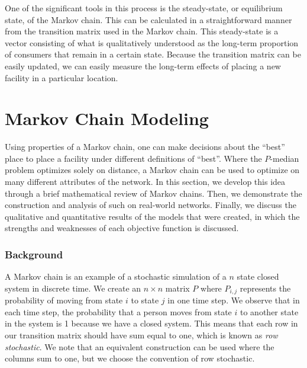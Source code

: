 \documentclass[twoside,twocolumn]{article}
\begin{document}
One of the significant tools in this process is the steady-state, or equilibrium state, of the Markov chain.
This can be calculated in a straightforward manner from the transition matrix used in the Markov chain.
This steady-state is a vector consisting of what is qualitatively understood as the long-term proportion of consumers that remain in a certain state. %
Because the transition matrix can be easily updated, we can easily measure the long-term effects of placing a new facility in a particular location.

\section{Markov Chain Modeling}

Using properties of a Markov chain, one can make decisions about the ``best'' place to place a facility under different definitions of ``best''.
Where the $P$-median problem optimizes solely on distance, a Markov chain can be used to optimize on many different attributes of the network.
In this section, we develop this idea through a brief mathematical review of Markov chains.
Then, we demonstrate the construction and analysis of such on real-world networks. %
Finally, we discuss the qualitative and quantitative results of the models that were created, in which the strengths and weaknesses of each objective function is discussed. %

\subsubsection{Background}

A Markov chain is an example of a stochastic simulation of a $n$ state closed system in discrete time.
We create an $n\times n$ matrix $P$ where $P_{i,j}$ represents the probability of moving from state $i$ to state $j$ in one time step.
We observe that in each time step, the probability that a person moves from state $i$ to another state in the system is 1 because we have a closed system.
This means that each row in our transition matrix should have sum equal to one, which is known as {\em row stochastic}.
We note that an equivalent construction can be used where the columns sum to one, but we choose the convention of row stochastic.%
\end{document}
